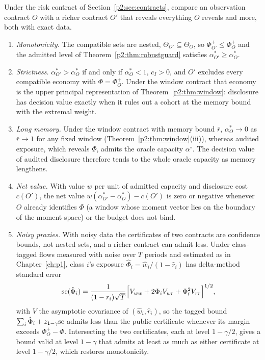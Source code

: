 \begin{theorem}\label{p2:thm:disclosure}
Under the risk contract of Section~\ref{p2:sec:contracts}, compare an observation contract $O$ with a richer contract $O'$ that reveals everything $O$ reveals and more, both with exact data.
\begin{enumerate}[label=(\roman*)]
\item \emph{Monotonicity.} The compatible sets are nested, $\Theta_{O'}\subseteq\Theta_O$, so $\Phi^+_{O'}\le\Phi^+_O$ and the admitted level of Theorem~\ref{p2:thm:robustguard} satisfies $\alpha^*_{O'}\ge\alpha^*_O$.
\item \emph{Strictness.} $\alpha^*_{O'}>\alpha^*_O$ if and only if $\alpha^*_O<1$, $c_I>0$, and $O'$ excludes every compatible economy with $\Phi=\Phi^+_O$. Under the window contract that economy is the upper principal representation of Theorem~\ref{p2:thm:window}: disclosure has decision value exactly when it rules out a cohort at the memory bound with the extremal weight.
\item \emph{Long memory.} Under the window contract with memory bound $\bar r$, $\alpha^*_O\to0$ as $\bar r\to1$ for any fixed window (Theorem~\ref{p2:thm:window}(iii)), whereas audited exposure, which reveals $\Phi$, admits the oracle capacity $\alpha^\circ$. The decision value of audited disclosure therefore tends to the whole oracle capacity as memory lengthens.
\item \emph{Net value.} With value $w$ per unit of admitted capacity and disclosure cost $c(O')$, the net value $w(\alpha^*_{O'}-\alpha^*_O)-c(O')$ is zero or negative whenever $O$ already identifies $\Phi$ (a window whose moment vector lies on the boundary of the moment space) or the budget does not bind.
\item \emph{Noisy proxies.} With noisy data the certificates of two contracts are confidence bounds, not nested sets, and a richer contract can admit less. Under class-tagged flows measured with noise over $T$ periods and estimated as in Chapter~\ref{ch:p1}, class $i$'s exposure $\hat\Phi_i=\hat w_i/(1-\hat r_i)$ has delta-method standard error
\[
{\rm se}(\hat\Phi_i)=\frac{1}{(1-r_i)\sqrt T}\Bigl[V_{ww}+2\Phi_iV_{wr}+\Phi_i^2V_{rr}\Bigr]^{1/2},
\]
with $V$ the asymptotic covariance of $(\hat w_i,\hat r_i)$, so the tagged bound $\sum_i\hat\Phi_i+z_{1-\gamma}{\rm se}$ admits less than the public certificate whenever its margin exceeds $\Phi^+_O-\Phi$. Intersecting the two certificates, each at level $1-\gamma/2$, gives a bound valid at level $1-\gamma$ that admits at least as much as either certificate at level $1-\gamma/2$, which restores monotonicity.
\end{enumerate}
\end{theorem}

